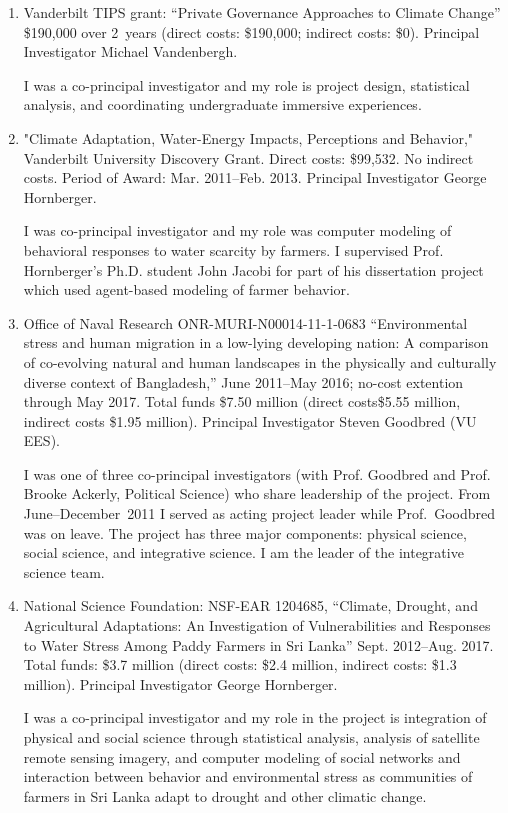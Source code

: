 \begin{enumerate}
%
%
\item Vanderbilt TIPS grant: ``Private Governance Approaches to Climate Change'' \$190,000 over 2~years (direct costs: \$190,000; indirect costs: \$0). Principal Investigator Michael Vandenbergh.
\begin{credit}
I was a co-principal investigator and my role is project design, statistical analysis, and coordinating undergraduate immersive experiences.
\end{credit}
%
%
\item "Climate Adaptation, Water-Energy Impacts, Perceptions and Behavior," Vanderbilt University Discovery Grant. Direct costs: \$99,532. No indirect costs. Period of Award: Mar. 2011--Feb. 2013. Principal Investigator George Hornberger.
\begin{credit}
I was co-principal investigator and my role was computer modeling of behavioral responses to water scarcity by farmers. I supervised Prof. Hornberger's Ph.D. student John Jacobi for part of his dissertation project which used agent-based modeling of farmer behavior.
\end{credit}
%
%
\item Office of Naval Research ONR-MURI-N00014-11-1-0683 ``Environmental stress and human migration in a low-lying developing nation: A comparison of co-evolving natural and human landscapes in the physically and culturally diverse context of Bangladesh,'' June 2011--May 2016; no-cost extention through May 2017. Total funds \$7.50 million (direct costs\$5.55 million, indirect costs \$1.95 million). Principal Investigator Steven Goodbred (VU EES).
\begin{credit}
I was one of three co-principal investigators (with Prof. Goodbred and Prof. Brooke Ackerly, Political Science) who share leadership of the project. From June--December~2011 I served as acting project leader while Prof.~Goodbred was on leave. The project has three major components: physical science, social science, and integrative science. I am the leader of the integrative science team.
\end{credit}
%
%
\item National Science Foundation: NSF-EAR 1204685, ``Climate, Drought, and Agricultural Adaptations: An Investigation of Vulnerabilities and Responses to Water Stress Among Paddy Farmers in Sri Lanka'' Sept. 2012--Aug. 2017. Total funds: \$3.7 million (direct costs: \$2.4 million, indirect costs: \$1.3 million). Principal Investigator George Hornberger.
\begin{credit}
I was a co-principal investigator and my role in the project is integration of physical and social science through statistical analysis, analysis of satellite remote sensing imagery, and computer modeling of social networks and interaction between behavior and environmental stress as communities of farmers in Sri Lanka adapt to drought and other climatic change.
\end{credit}
\end{enumerate}
\iffalse
\subsubsection{Under Review}
\begin{enumerate}
  \iffalse
  \fi

\end{enumerate}%
\fi
